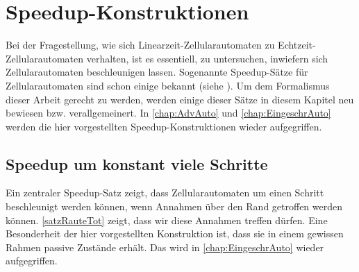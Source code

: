 \chapter{Speedup-Konstruktionen}
\label{chap:SpeedupKonstr}

Bei der Fragestellung, wie sich Linearzeit-Zellularautomaten zu Echt\-zeit-Zell\-u\-lar\-au\-to\-ma\-ten verhalten,
ist es essentiell, zu untersuchen, inwiefern sich Zellularautomaten beschleunigen lassen.
Sogenannte Speedup-Sätze für Zellularautomaten sind schon einige bekannt (siehe \cite{Kutrib2009, MAZOYER199259}).
Um dem Formalismus dieser Arbeit gerecht zu werden, werden einige dieser Sätze in diesem Kapitel neu bewiesen \acs{bzw.} verallgemeinert.
In \cref{chap:AdvAuto} und \cref{chap:EingeschrAuto} werden die hier vorgestellten Speedup-Konstruktionen wieder aufgegriffen.

\section{Speedup um konstant viele Schritte}

Ein zentraler Speedup-Satz zeigt, dass Zellularautomaten um einen Schritt beschleunigt werden können,
wenn Annahmen über den Rand getroffen werden können. \cref{satzRauteTot} zeigt, dass wir diese Annahmen treffen dürfen.
Eine Besonderheit der hier vorgestellten Konstruktion ist, dass sie in einem gewissen Rahmen passive Zustände erhält.
Das wird in \cref{chap:EingeschrAuto} wieder aufgegriffen.

